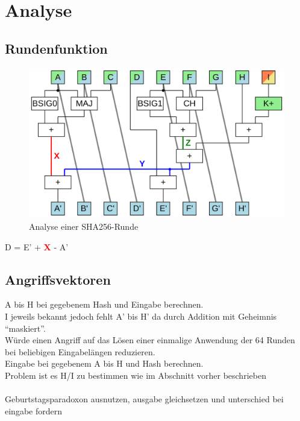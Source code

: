 \section{Analyse}
\label{sec:sha256:analyse}


\subsection{Rundenfunktion}

\begin{figure}[!h]
  \centering
  \includegraphics[scale=0.4]{images/sha256coreA}
  \caption{Analyse einer SHA256-Runde}
  \label{fig:sha256coreA}
\end{figure}

D = E' + \textcolor{red}{\textbf{X}} - A'

\subsection{Angriffsvektoren}

A bis H bei gegebenem Hash und Eingabe berechnen.\\
I jeweils bekannt jedoch fehlt A' bis H' da durch Addition mit Geheimnis "`maskiert"'.\\
Würde einen Angriff auf das Lösen einer einmalige Anwendung der 64 Runden bei beliebigen Eingabelängen reduzieren.
~\\
Eingabe bei gegebenem A bis H und Hash berechnen.\\
Problem ist es H/I zu bestimmen wie im Abschnitt vorher beschrieben\\
~\\
Geburtstagsparadoxon ausnutzen, ausgabe gleichsetzen und unterschied bei eingabe fordern